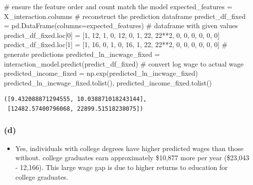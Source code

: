 \documentclass[
  letterpaper,
  DIV=11,
  numbers=noendperiod]{scrartcl}
\newenvironment{Shaded}{\begin{snugshade}}{\end{snugshade}}
\newcommand{\CommentTok}[1]{\textcolor[rgb]{0.37,0.37,0.37}{#1}}
\newcommand{\DecValTok}[1]{\textcolor[rgb]{0.68,0.00,0.00}{#1}}
\newcommand{\NormalTok}[1]{\textcolor[rgb]{0.00,0.23,0.31}{#1}}
\newcommand{\OperatorTok}[1]{\textcolor[rgb]{0.37,0.37,0.37}{#1}}
\providecommand{\tightlist}{%
  \setlength{\itemsep}{0pt}\setlength{\parskip}{0pt}}\usepackage{longtable,booktabs,array}
\begin{document}
\begin{Shaded}
\begin{Highlighting}[]
\CommentTok{\# ensure the feature order and count match the model}
\NormalTok{expected\_features }\OperatorTok{=}\NormalTok{ X\_interaction.columns }
\CommentTok{\# reconstruct the prediction dataframe }
\NormalTok{predict\_df\_fixed }\OperatorTok{=}\NormalTok{ pd.DataFrame(columns}\OperatorTok{=}\NormalTok{expected\_features)}
\CommentTok{\# dataframe with given values}
\NormalTok{predict\_df\_fixed.loc[}\DecValTok{0}\NormalTok{] }\OperatorTok{=}\NormalTok{ [}\DecValTok{1}\NormalTok{, }\DecValTok{12}\NormalTok{, }\DecValTok{1}\NormalTok{, }\DecValTok{0}\NormalTok{, }\DecValTok{12}\NormalTok{, }\DecValTok{0}\NormalTok{, }\DecValTok{1}\NormalTok{, }\DecValTok{22}\NormalTok{, }\DecValTok{22}\OperatorTok{**}\DecValTok{2}\NormalTok{, }\DecValTok{0}\NormalTok{, }\DecValTok{0}\NormalTok{, }\DecValTok{0}\NormalTok{, }\DecValTok{0}\NormalTok{, }\DecValTok{0}\NormalTok{, }\DecValTok{0}\NormalTok{]  }
\NormalTok{predict\_df\_fixed.loc[}\DecValTok{1}\NormalTok{] }\OperatorTok{=}\NormalTok{ [}\DecValTok{1}\NormalTok{, }\DecValTok{16}\NormalTok{, }\DecValTok{0}\NormalTok{, }\DecValTok{1}\NormalTok{, }\DecValTok{0}\NormalTok{, }\DecValTok{16}\NormalTok{, }\DecValTok{1}\NormalTok{, }\DecValTok{22}\NormalTok{, }\DecValTok{22}\OperatorTok{**}\DecValTok{2}\NormalTok{, }\DecValTok{0}\NormalTok{, }\DecValTok{0}\NormalTok{, }\DecValTok{0}\NormalTok{, }\DecValTok{0}\NormalTok{, }\DecValTok{0}\NormalTok{, }\DecValTok{0}\NormalTok{]  }
\CommentTok{\# generate predictions }
\NormalTok{predicted\_ln\_incwage\_fixed }\OperatorTok{=}\NormalTok{ interaction\_model.predict(predict\_df\_fixed)}
\CommentTok{\# convert log wage to actual wage}
\NormalTok{predicted\_income\_fixed }\OperatorTok{=}\NormalTok{ np.exp(predicted\_ln\_incwage\_fixed)}
\NormalTok{predicted\_ln\_incwage\_fixed.tolist(), predicted\_income\_fixed.tolist()}
\end{Highlighting}
\end{Shaded}

\begin{verbatim}
([9.432088871294555, 10.038871018243144],
 [12482.57400796068, 22899.51518238075])
\end{verbatim}

\subsubsection{(d)}\label{d-2}

\begin{itemize}
\tightlist
\item
  Yes, individuals with college degrees have higher predicted wages than
  those without. college graduates earn approximately \$10,877 more per
  year (\$23,043 - 12,166). This large wage gap is due to higher returns
  to education for college graduates.
\end{itemize}
\end{document}
